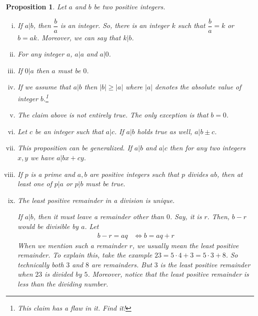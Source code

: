 \documentclass[a4paper, leqno]{article}
\newtheorem{proposition}{Proposition}
\theoremstyle{definition}
\theoremstyle{remark}
\begin{document}
		\begin{proposition}
			Let $a$ and $b$ be two positive integers.
				\begin{enumerate}[i.]
					\item If $a|b$, then $\dfrac{b}{a}$ is an integer. So, there is an integer $k$ such that $\dfrac{b}{a}=k$ or $b=ak$. Moreover, we can say that $k|b$.
					\item For any integer $a$, $a|a$ and $a|0$.
					\item If $0|a$ then $a$ must be $0$.
					\item If we assume that $a|b$ then $|b|\geq |a|$ where $|a|$ denotes the absolute value of integer $b$.\footnote{This claim has a flaw in it. Find it!}
					\item The claim above is not entirely true. The only exception is that $b=0$.
					\item Let $c$ be an integer such that $a|c$. If $a|b$ holds true as well, $a|b\pm c$.
					\item This proposition can be generalized. If $a|b$ and $a|c$ then for any two integers $x,y$ we have $a|bx+cy$.
					\item[Euclid's Lemma] If $p$ is a prime and $a,b$ are positive integers such that $p$ divides $ab$, then at least one of $p|a$ or $p|b$ must be true.
					\item The least positive remainder in a division is unique.
					
					{\normalfont If $a|b$, then it must leave a remainder other than $0$. Say, it is $r$. Then, $b-r$ would be divisible by $a$. Let
						\begin{align*}
							b-r=aq & \iff b=aq+r
						\end{align*}
					When we mention such a remainder $r$, we usually mean the least positive remainder. To explain this, take the example $23=5\cdot4+3=5\cdot3+8$. So technically both $3$ and $8$ are remainders. But $3$ is the least positive remainder when $23$ is divided by $5$. Moreover, notice that the least positive remainder is less than the dividing number.
					
}
\end{enumerate}
\end{proposition}
\end{document}
